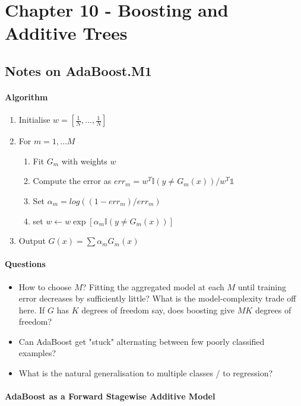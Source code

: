 \chapter{Chapter 10 - Boosting and Additive Trees}

\section*{Notes on AdaBoost.M1}
\subsubsection*{Algorithm}
\begin{enumerate}
    \item Initialise $w = \left[\frac{1}{N}, \dots, \frac{1}{N} \right]$
    \item For $m = 1, \dots M$
    \begin{enumerate}
        \item Fit $G_m$ with weights $w$
        \item Compute the error as $err_m = w^T \mathbb{I}(y \neq G_m(x)) / w^T \mathbb{1}$
        \item Set $\alpha_m = log((1-err_m) / err_m)$
        \item set $w \leftarrow w  \exp\left[\alpha_m \mathbb{I}(y \neq G_m(x))\right]$
    \end{enumerate}
    \item Output $G(x) = \sum \alpha_m G_m(x)$
\end{enumerate}
\subsubsection*{Questions}
\begin{itemize}
    \item How to choose $M$? Fitting the aggregated model at each $M$ until training error decreases by sufficiently little? What is the model-complexity trade off here. If $G$ has $K$ degrees of freedom say, does boosting give $MK$ degrees of freedom?
    \item Can AdaBoost get "stuck" alternating between few poorly classified examples?
    \item What is the natural generalisation to multiple classes / to regression?
\end{itemize}

\subsubsection*{AdaBoost as a Forward Stagewise Additive Model}

